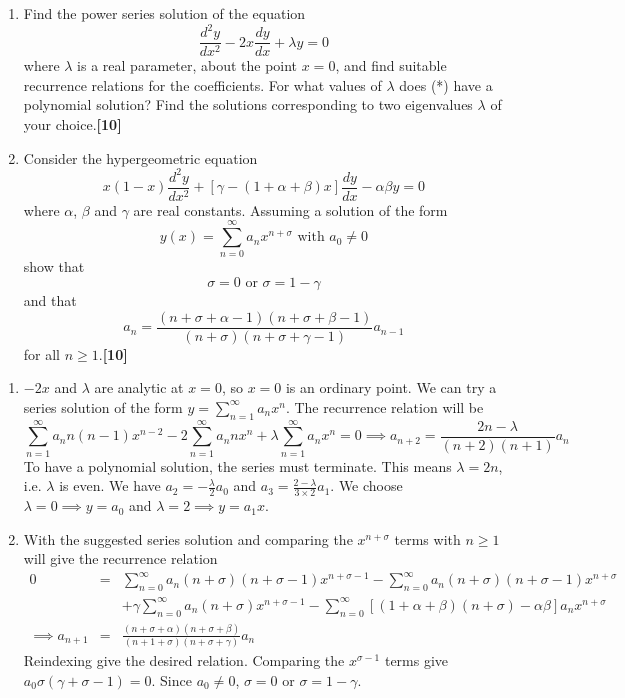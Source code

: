 \documentclass[a4paper]{article}
\begin{document}
\begin{qns}\leavevmode
\begin{enumerate}[label=(\alph*)]
\item Find the power series solution of the equation
\begin{equation}
\frac{d^2y}{dx^2}-2x\frac{dy}{dx}+\lambda y=0\tag{*}
\end{equation}
where $\lambda$ is a real parameter, about the point $x = 0$, and find suitable recurrence relations for the coefficients. For what values of $\lambda$ does (*) have a polynomial solution? Find the solutions corresponding to two eigenvalues $\lambda$ of your choice.\hfill\textbf{[10]}
\item Consider the hypergeometric equation
$$x(1-x)\frac{d^2y}{dx^2}+[\gamma-(1+\alpha+\beta)x]\frac{dy}{dx}-\alpha\beta y=0$$
where $\alpha$, $\beta$ and $\gamma$ are real constants. Assuming a solution of the form
$$y(x)=\sum_{n=0}^\infty a_nx^{n+\sigma}\text{ with }a_0\neq 0$$
show that
$$\sigma=0\text{ or   }\sigma=1-\gamma$$
and that
$$a_n=\frac{(n+\sigma+\alpha-1)(n+\sigma+\beta-1)}{(n+\sigma)(n+\sigma+\gamma-1)}a_{n-1}$$
for all $n\geq1$.\hfill\textbf{[10]}
\end{enumerate}
\end{qns}
\begin{ans}\leavevmode
\begin{enumerate}[label=(\alph*)]
\item $-2x$ and $\lambda$ are analytic at $x=0$, so $x=0$ is an ordinary point. We can try a series solution of the form $y=\sum_{n=1}^\infty a_nx^n$. The recurrence relation will be
$$\sum_{n=1}^\infty a_nn(n-1)x^{n-2}-2\sum_{n=1}^\infty a_nnx^n+\lambda\sum_{n=1}^\infty a_nx^n=0\implies a_{n+2}=\frac{2n-\lambda}{(n+2)(n+1)}a_n$$
To have a polynomial solution, the series must terminate. This means $\lambda=2n$, i.e. $\lambda$ is even. We have $a_2=-\frac{\lambda}{2}a_0$ and $a_3=\frac{2-\lambda}{3\times 2}a_1$. We choose $\lambda=0\implies y=a_0$ and $\lambda=2\implies y=a_1x$.
\item With the suggested series solution and comparing the $x^{n+\sigma}$ terms with $n\geq 1$ will give the recurrence relation
\begin{eqnarray}
0&=&\sum_{n=0}^\infty a_n(n+\sigma)(n+\sigma-1)x^{n+\sigma-1}-\sum_{n=0}^\infty a_n(n+\sigma)(n+\sigma-1)x^{n+\sigma}\nonumber\\&&+\gamma\sum_{n=0}^\infty a_n(n+\sigma)x^{n+\sigma-1}-\sum_{n=0}^\infty[(1+\alpha+\beta)(n+\sigma)-\alpha\beta] a_n x^{n+\sigma}\nonumber\\\implies a_{n+1}&=&\frac{(n+\sigma+\alpha)(n+\sigma+\beta)}{(n+1+\sigma)(n+\sigma+\gamma)}a_n\nonumber
\end{eqnarray}
Reindexing give the desired relation. Comparing the $x^{\sigma-1}$ terms give $a_0\sigma(\gamma+\sigma-1)=0$. Since $a_0\neq 0$, $\sigma=0$ or $\sigma=1-\gamma$.
\end{enumerate}
\end{ans}
\end{document}
